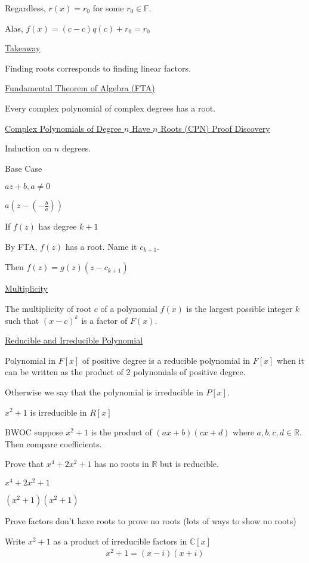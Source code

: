 \documentclass{article}
\begin{document}
Regardless, $r(x) = r_0$ for some $r_0 \in \mathbb{F}$. 

Alas, $f(x) = (c-c)q(c) + r_0 = r_0$

\underline{Takeaway}

Finding roots corresponds to finding linear factors. 

\underline{Fundamental Theorem of Algebra (FTA)}

Every complex polynomial of complex degrees has a root. 

\underline{Complex Polynomials of Degree $n$ Have $n$ Roots (CPN) Proof Discovery}

Induction on $n$ degrees. 

Base Case

$az + b, a \ne 0$

$a(z - (-\frac{b}{a}))$

If $f(z)$ has degree $k+1$

By FTA, $f(z)$ has a root. Name it $c_{k+1}$.

Then $f(z) = g(z)(z-c_{k+1})$

\underline{Multiplicity}

The multiplicity of root $c$ of a polynomial $f(x)$ is the largest possible integer $k$ such that $(x-c)^k$ is a factor of $F(x)$.

\underline{Reducible and Irreducible Polynomial}

Polynomial in $F[x]$ of positive degree is a reducible polynomial in $F[x]$ when it can be written as the product of 2 polynomials of positive degree. 

Otherwise we say that the polynomial is irreducible in $P[x]$. 



$x^2 + 1$ is irreducible in $R[x]$

BWOC suppose $x^2 + 1$ is the product of $(ax+b)(cx+d)$ where $a,b,c,d \in \mathbb{R}$. Then compare coefficients. 

Prove that $x^4+2x^2 + 1$ has no roots in $\mathbb{R}$ but is reducible. 

$x^4+2x^2+1$ 

$(x^2+1)(x^2+1)$

Prove factors don't have roots to prove no roots (lots of ways to show no roots)

Write $x^2+1$ as a product of irreducible factors in $\mathbb{C}[x]$
\begin{align*}
    x^2+1 = (x-i)(x+i)
\end{align*}
\end{document}
